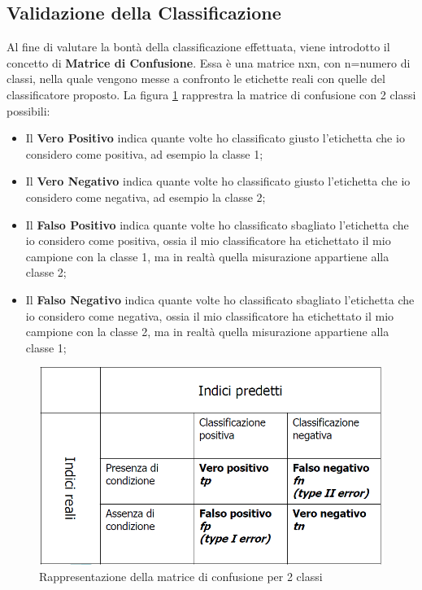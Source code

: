 \subsection{Validazione della Classificazione}
Al fine di valutare la bontà della classificazione effettuata, viene introdotto il concetto di \textbf{Matrice di Confusione}. Essa è una matrice nxn, con n=numero di classi, nella quale vengono messe a confronto le etichette reali con quelle del classificatore proposto. La figura \ref{immagine_matrice_confusione_2classi}  rapprestra la matrice di confusione con 2 classi possibili:
\begin{itemize}
	\item Il \textbf{Vero Positivo} indica quante volte ho classificato giusto l'etichetta che io considero come positiva, ad esempio la classe 1;
	\item Il \textbf{Vero Negativo} indica quante volte ho classificato giusto l'etichetta che io considero come negativa, ad esempio la classe 2;
	\item Il \textbf{Falso Positivo} indica quante volte ho classificato sbagliato l'etichetta che io considero come positiva, ossia il mio classificatore ha etichettato il mio campione con la classe 1, ma in realtà quella misurazione appartiene alla classe 2;
	\item Il \textbf{Falso Negativo} indica quante volte ho classificato sbagliato l'etichetta che io considero come negativa, ossia il mio classificatore ha etichettato il mio campione con la classe 2, ma in realtà quella misurazione appartiene alla classe 1;
\end{itemize}
\begin{figure}[h!]
	\centering
	\includegraphics[scale=0.5]{images/matrice_confusione.png}
	\caption{Rappresentazione della matrice di confusione per 2 classi}
	\label{immagine_matrice_confusione_2classi}
\end{figure}
